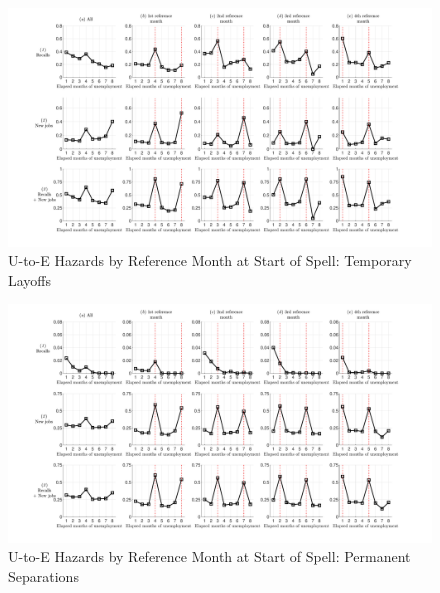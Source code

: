 \documentclass[12pt]{article}
\begin{document}
  \begin{landscape}
    \begin{figure}
    \caption{U-to-E Hazards by Reference Month at Start of Spell: 
    Temporary Layoffs\label{fig:UEtl}}
    \centerline{\includegraphics[width=1.00\linewidth]{./../figures/TL}}
    \end{figure}

  \begin{figure}
  \caption{U-to-E Hazards by Reference Month at Start of Spell: 
  Permanent Separations\label{fig:UEtl}}
  \centerline{\includegraphics[width=1.00\linewidth]{./../figures/PS}}
  \end{figure}
  \end{landscape}
\end{document}

